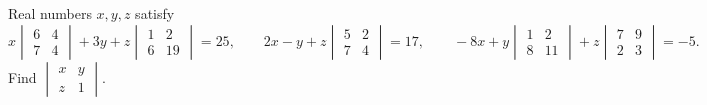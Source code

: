 Real numbers $x,y,z$ satisfy
\[x\begin{vmatrix}6&4\\7&4\end{vmatrix}+3y+z\begin{vmatrix}1&2\\6&19\end{vmatrix}=25,\qquad2x-y+z\begin{vmatrix}5&2\\7&4\end{vmatrix}=17,\qquad-8x+y\begin{vmatrix}1&2\\8&11\end{vmatrix}+z\begin{vmatrix}7&9\\2&3\end{vmatrix}=-5.\]
Find $\begin{vmatrix}x&y\\z&1\end{vmatrix}$.
